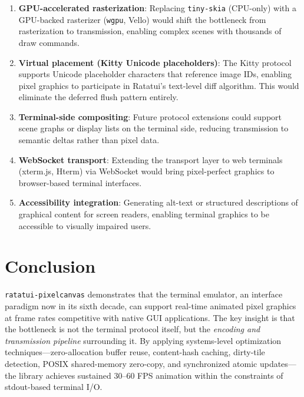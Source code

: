 \documentclass[11pt, a4paper, twocolumn]{article}
\begin{document}
\begin{enumerate}[leftmargin=1.5em, itemsep=0.2em]
    \item \textbf{GPU-accelerated rasterization}: Replacing \texttt{tiny-skia} (CPU-only) with a GPU-backed rasterizer (\texttt{wgpu}, Vello) would shift the bottleneck from rasterization to transmission, enabling complex scenes with thousands of draw commands.

    \item \textbf{Virtual placement (Kitty Unicode placeholders)}: The Kitty protocol supports Unicode placeholder characters that reference image IDs, enabling pixel graphics to participate in Ratatui's text-level diff algorithm.
    This would eliminate the deferred flush pattern entirely.

    \item \textbf{Terminal-side compositing}: Future protocol extensions could support scene graphs or display lists on the terminal side, reducing transmission to semantic deltas rather than pixel data.

    \item \textbf{WebSocket transport}: Extending the transport layer to web terminals (xterm.js, Hterm) via WebSocket would bring pixel-perfect graphics to browser-based terminal interfaces.

    \item \textbf{Accessibility integration}: Generating alt-text or structured descriptions of graphical content for screen readers, enabling terminal graphics to be accessible to visually impaired users.
\end{enumerate}

\section{Conclusion}
\label{sec:conclusion}

\texttt{ratatui-pixelcanvas} demonstrates that the terminal emulator, an interface paradigm now in its sixth decade, can support real-time animated pixel graphics at frame rates competitive with native GUI applications.
The key insight is that the bottleneck is not the terminal protocol itself, but the \emph{encoding and transmission pipeline} surrounding it.
By applying systems-level optimization techniques---zero-allocation buffer reuse, content-hash caching, dirty-tile detection, POSIX shared-memory zero-copy, and synchronized atomic updates---the library achieves sustained 30--60 FPS animation within the constraints of stdout-based terminal I/O.
\end{document}
